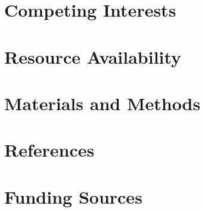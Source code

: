 \documentclass[11pt]{elife} %
\begin{document}

\section{Competing Interests}



\section{Resource Availability}



\section{Materials and Methods}



\nocite{*} 

\section{References}



\section{Funding Sources}


\end{document}
